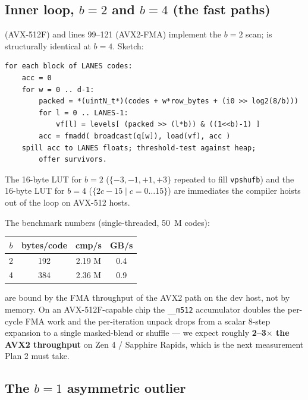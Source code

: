 \documentclass[11pt,a4paper]{article}
\begin{document}
\subsection{Inner loop, $b=2$ and $b=4$ (the fast paths)}

 (AVX-512F) and lines 99--121
(AVX2-FMA) implement the $b = 2$ scan;
 is structurally identical at $b = 4$.
Sketch:

\begin{lstlisting}[style=plainstyle]
for each block of LANES codes:
    acc = 0
    for w = 0 .. d-1:
        packed = *(uintN_t*)(codes + w*row_bytes + (i0 >> log2(8/b)))
        for l = 0 .. LANES-1:
            vf[l] = levels[ (packed >> (l*b)) & ((1<<b)-1) ]
        acc = fmadd( broadcast(q[w]), load(vf), acc )
    spill acc to LANES floats; threshold-test against heap;
        offer survivors.
\end{lstlisting}

The 16-byte LUT for $b = 2$ ($\{-3, -1, +1, +3\}$ repeated to fill
\texttt{vpshufb}) and the 16-byte LUT for $b = 4$ ($\{2c - 15 \mid c =
0\dots 15\}$) are immediates the compiler hoists out of the loop on
AVX-512 hosts.

The benchmark numbers (single-threaded, 50~M codes):

\begin{center}
\begin{tabular}{cccc}
\toprule
$b$ & bytes/code & cmp/s & GB/s \\
\midrule
2 & 192 & 2.19 M & 0.4 \\
4 & 384 & 2.36 M & 0.9 \\
\bottomrule
\end{tabular}
\end{center}

are bound by the FMA throughput of the AVX2 path on the dev host, not
by memory. On an AVX-512F-capable chip the \texttt{\_\_m512}
accumulator doubles the per-cycle FMA work and the per-iteration
unpack drops from a scalar 8-step expansion to a single masked-blend
or shuffle --- we expect roughly \textbf{2--3$\times$ the AVX2
throughput} on Zen 4 / Sapphire Rapids, which is the next measurement
Plan 2 must take.

\subsection{The $b=1$ asymmetric outlier}
\label{sec:b1-outlier}
\end{document}
